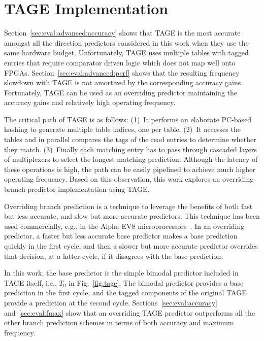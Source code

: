 \section{TAGE Implementation}
\label{sec:advanced:tage}
Section~\ref{sec:eval:advanced:accuracy} shows that TAGE  is the most accurate amongst all the direction predictors considered in this work when they use the same hardware budget. Unfortunately, TAGE uses multiple tables with tagged entries that require comparator driven logic which does not map well onto FPGAs. Section~\ref{sec:eval:advanced:perf} shows that the resulting frequency slowdown with TAGE is not amortized by the corresponding accuracy gains. Fortunately, TAGE can be used as an overriding predictor maintaining the accuracy gains and relatively high operating frequency.

The critical path of TAGE is as follows: (1)~It performs an elaborate PC-based hashing to generate multiple table indices, one per table. (2)~It accesses the tables and in parallel compares the tags of the read entries to determine whether they match. (3)~Finally each matching entry has to pass through cascaded layers of multiplexers to select the longest matching prediction. Although the latency of these operations is high, the path can be easily pipelined to achieve much higher operating frequency. Based on this observation, this work explores an overriding branch predictor implementation using TAGE.

Overriding branch prediction is a technique to leverage the benefits of both fast but less accurate, and slow but more accurate predictors. This technique has been used commercially, e.g., in the Alpha EV8 microprocessors~\cite{alphaEV8}. In an overriding predictor, a faster but less accurate base predictor makes a base prediction quickly in the first cycle, and then a slower but more accurate predictor overrides that decision, at a latter cycle, if it disagrees with the base prediction. 

In this work, the base predictor is the simple bimodal predictor included in TAGE itself, i.e., $T_0$ in Fig.~\ref{fig:tage}. The bimodal predictor provides a base prediction in the first cycle, and the tagged components of the original TAGE provide a prediction at the second cycle. Sections~\ref{sec:eval:accuracy} and~\ref{sec:eval:fmax} show that an overriding TAGE predictor outperforms all the other branch prediction schemes in terms of both accuracy and maximum frequency.

